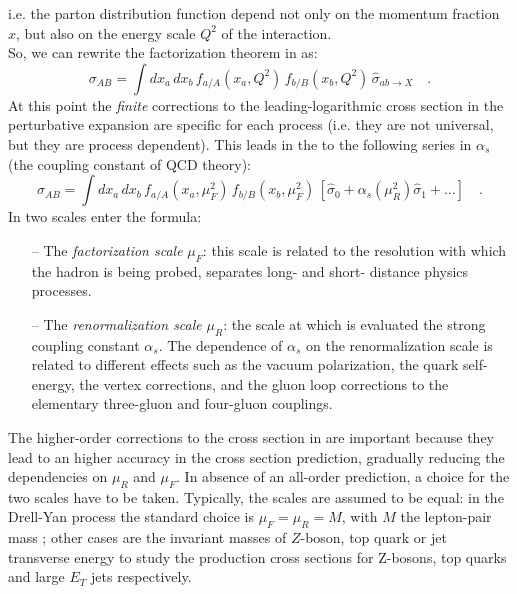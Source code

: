 i.e. the parton distribution function depend not only on the momentum fraction $x$, but also on the energy scale $Q^2$ of the interaction. 
\\
So, we can rewrite the factorization theorem in  as:
\begin{equation}
	\sigma_{AB}=\displaystyle\int dx_a\,dx_b\,f_{a/A}(x_a,Q^2)\,f_{b/B}(x_b,Q^2)\,\hat{\sigma}_{ab \rightarrow X}\quad .
\label{eq:factorization2}
\end{equation}
At this point the \emph{finite} corrections to the leading-logarithmic cross section in the perturbative expansion are specific for each process (i.e. they are not universal, but they are process dependent). This leads in the  to the following series in $\alpha_s$ (the coupling constant of QCD theory):
\begin{equation}
	\sigma_{AB}=\displaystyle\int dx_a\,dx_b\,f_{a/A}(x_a,\mu_F^2)\,f_{b/B}(x_b,\mu_F^2)\,\left[\hat{\sigma}_0+\alpha_s(\mu_R^2)\hat{\sigma}_1+\dots\right]\quad .
\label{eq:factorization3}
\end{equation}
In  two scales enter the formula:
\begin{itemize}
	\item[--] The \textit{factorization scale} $\mu_F$: this scale is related to the resolution with which the hadron is being probed, separates long- and short- distance physics processes.
	\item[--] The \textit{renormalization scale} $\mu_R$: the scale at which is evaluated the strong coupling constant $\alpha_s$. The dependence of $\alpha_s$ on the renormalization scale is related to different effects such as  the vacuum polarization, the quark self-energy, the vertex corrections, and the gluon loop corrections to the elementary three-gluon and four-gluon couplings.
\end{itemize}

The higher-order corrections to the cross section in  are important because they lead to an higher accuracy in the cross section prediction, gradually reducing the dependencies on $\mu_R$ and $\mu_F$. In absence of an all-order prediction, a choice for the two scales have to be taken.
Typically, the scales are assumed to be equal: in the Drell-Yan process the standard choice is $\mu_F=\mu_R=M$, with $M$ the lepton-pair mass \cite{Campbell2006}; other cases are the invariant masses of $Z$-boson, top quark or jet transverse energy to study \cite{Campbell2006} the production cross sections for Z-bosons, top quarks and large $E_T$ jets respectively.

